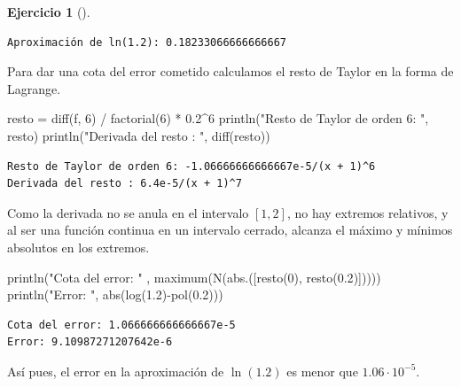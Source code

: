 \documentclass[
  a4paper,
]{scrreport}
\newenvironment{Shaded}{\begin{snugshade}}{\end{snugshade}}
\newcommand{\FloatTok}[1]{\textcolor[rgb]{0.68,0.00,0.00}{#1}}
\newcommand{\FunctionTok}[1]{\textcolor[rgb]{0.28,0.35,0.67}{#1}}
\newcommand{\NormalTok}[1]{\textcolor[rgb]{0.00,0.23,0.31}{#1}}
\newcommand{\OperatorTok}[1]{\textcolor[rgb]{0.37,0.37,0.37}{#1}}
\newcommand{\StringTok}[1]{\textcolor[rgb]{0.13,0.47,0.30}{#1}}
\theoremstyle{definition}
\newtheorem{exercise}{Ejercicio}[chapter]
\theoremstyle{remark}
\begin{document}
\begin{exercise}[]
\begin{tcolorbox}
\begin{verbatim}
Aproximación de ln(1.2): 0.18233066666666667
\end{verbatim}

Para dar una cota del error cometido calculamos el resto de Taylor en la
forma de Lagrange.

\begin{Shaded}
\begin{Highlighting}[]
\NormalTok{resto }\OperatorTok{=} \FunctionTok{diff}\NormalTok{(f, }\FloatTok{6}\NormalTok{) }\OperatorTok{/} \FunctionTok{factorial}\NormalTok{(}\FloatTok{6}\NormalTok{) }\OperatorTok{*} \FloatTok{0.2}\OperatorTok{\^{}}\FloatTok{6}
\FunctionTok{println}\NormalTok{(}\StringTok{"Resto de Taylor de orden 6: "}\NormalTok{, resto)}
\FunctionTok{println}\NormalTok{(}\StringTok{"Derivada del resto : "}\NormalTok{, }\FunctionTok{diff}\NormalTok{(resto))}
\end{Highlighting}
\end{Shaded}

\begin{verbatim}
Resto de Taylor de orden 6: -1.06666666666667e-5/(x + 1)^6
Derivada del resto : 6.4e-5/(x + 1)^7
\end{verbatim}

Como la derivada no se anula en el intervalo \([1,2]\), no hay extremos
relativos, y al ser una función continua en un intervalo cerrado,
alcanza el máximo y mínimos absolutos en los extremos.

\begin{Shaded}
\begin{Highlighting}[]
\FunctionTok{println}\NormalTok{(}\StringTok{"Cota del error: "}\NormalTok{ , }\FunctionTok{maximum}\NormalTok{(}\FunctionTok{N}\NormalTok{(}\FunctionTok{abs}\NormalTok{.([}\FunctionTok{resto}\NormalTok{(}\FloatTok{0}\NormalTok{), }\FunctionTok{resto}\NormalTok{(}\FloatTok{0.2}\NormalTok{)])))) }
\FunctionTok{println}\NormalTok{(}\StringTok{"Error: "}\NormalTok{, }\FunctionTok{abs}\NormalTok{(}\FunctionTok{log}\NormalTok{(}\FloatTok{1.2}\NormalTok{)}\FunctionTok{{-}pol}\NormalTok{(}\FloatTok{0.2}\NormalTok{)))}
\end{Highlighting}
\end{Shaded}

\begin{verbatim}
Cota del error: 1.066666666666667e-5
Error: 9.10987271207642e-6
\end{verbatim}

Así pues, el error en la aproximación de \(\ln(1.2)\) es menor que
\(1.06\cdot 10^{-5}\).


\end{tcolorbox}
\end{exercise}
\end{document}
